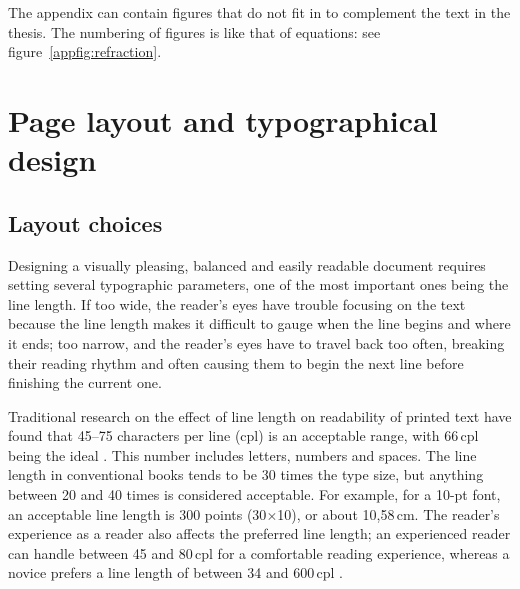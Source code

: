 \documentclass[english, 12pt, a4paper, biz, utf8, a-2b, online]{aaltothesis}
\begin{document}
The appendix can contain figures that do not fit in to complement the text in 
the thesis. The numbering of figures is like that of equations: see figure~\ref{appfig:refraction}.


\begin{table}[htb]
	\centering
	\caption{Caption for the table.}
	\label{apptab:schedule}
	\sffamily%
\end{table}


\clearpage
\section{Page layout and typographical design}
\label{app:layout}

\subsection*{Layout choices}

Designing a visually pleasing, balanced and easily readable document requires 
setting several typographic parameters, one of the most important ones being the
line length. If too wide, the reader’s eyes have trouble focusing on the text 
because the line length makes it difficult to gauge when the line begins and 
where it ends; too narrow, and the reader’s eyes have to travel back too often, 
breaking their reading rhythm and often causing them to begin the next line 
before finishing the current one.

Traditional research on the effect of line length on readability of printed text
have found that 45--75 characters per line (cpl) is an acceptable range, with 
66\,cpl being the ideal \cite{Bringhurst, Wikilinelength}. This number includes 
letters, numbers and spaces. The line length in conventional books tends to be 
30 times the type size, but anything between 20 and 40 times is considered 
acceptable. For example, for a 10-pt font, an acceptable line length is 300 
points (30$\times$10), or about 10,58\,cm. The reader’s experience as a reader 
also affects the preferred line length; an experienced reader can handle between
45 and 80\,cpl for a comfortable reading experience, whereas a novice prefers a 
line length of between 34 and 600\,cpl \cite{Unna}.
\end{document}
